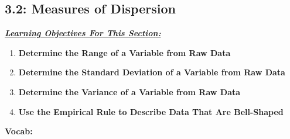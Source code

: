 \documentclass{report}
\begin{document}
        \subsection{3.2: Measures of Dispersion}
        \bigbreak \noindent 
        \textbf{\textit{\underline{Learning Objectives For This Section:}}}
        \begin{enumerate}
            \item \textbf{Determine the Range of a Variable from Raw Data}
            \item \textbf{Determine the Standard Deviation of a Variable from Raw Data}
            \item \textbf{Determine the Variance of a Variable from Raw Data}
            \item \textbf{Use the Empirical Rule to Describe Data That Are Bell-Shaped}
        \end{enumerate}
        \bigbreak \noindent 
        \textbf{Vocab:}
\end{document}
